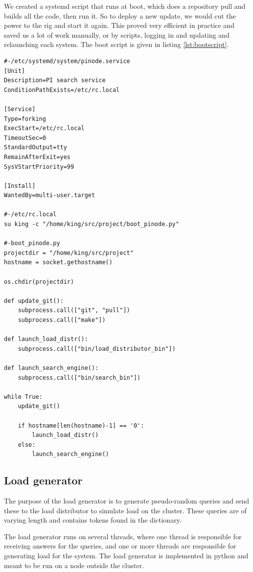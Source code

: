 We created a systemd script that runs at boot, which does a repository pull and builds all the code, then run it. So to deploy a new update, we would cut the power to the rig and start it again.
This proved very efficient in practice and saved us a lot of work manually, or by scripts, logging in and updating and relaunching each system. The boot script is given in listing \ref{lst:bootscript}.
\begin{lstlisting}[captionpos=b,caption={Our Systemd boot script. It launches a script that makes sure datetime is set before launching the update script.},label={lst:bootscript}]
#-/etc/systemd/system/pinode.service
[Unit]
Description=PI search service
ConditionPathExists=/etc/rc.local

[Service]
Type=forking
ExecStart=/etc/rc.local
TimeoutSec=0
StandardOutput=tty
RemainAfterExit=yes
SysVStartPriority=99

[Install]
WantedBy=multi-user.target

#-/etc/rc.local
su king -c "/home/king/src/project/boot_pinode.py"

#-boot_pinode.py
projectdir = "/home/king/src/project"
hostname = socket.gethostname()

os.chdir(projectdir)

def update_git():
    subprocess.call(["git", "pull"])
    subprocess.call(["make"])

def launch_load_distr():
    subprocess.call(["bin/load_distributor_bin"])

def launch_search_engine():
    subprocess.call(["bin/search_bin"])

while True:
    update_git()

    if hostname[len(hostname)-1] == '0':
        launch_load_distr()
    else:
        launch_search_engine()

\end{lstlisting}

\subsection{Load generator}
The purpose of the load generator is to generate pseudo-random queries and send these to the load distributor to simulate load on the cluster. These queries are of varying length and contains tokens found in the dictionary.

The load generator runs on several threads, where one thread is responsible for receiving answers for the queries, and one or more threads are responsible for generating load for the system. The load generator is implemented in python and meant to be run on a node outside the cluster.

